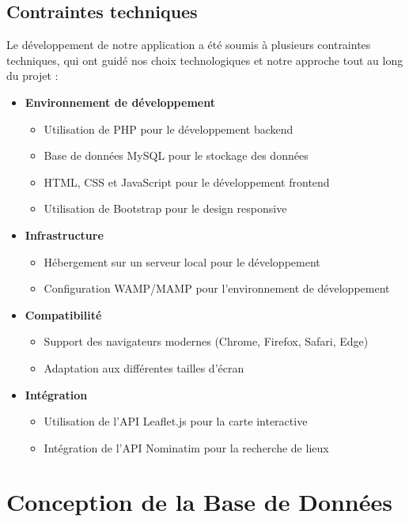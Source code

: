 \documentclass[a4paper,12pt]{article}
\begin{document}
\subsection{Contraintes techniques}

Le développement de notre application a été soumis à plusieurs contraintes techniques, qui ont guidé nos choix technologiques et notre approche tout au long du projet :

\begin{itemize}
  \item \textbf{Environnement de développement}
  \begin{itemize}
    \item Utilisation de PHP pour le développement backend
    \item Base de données MySQL pour le stockage des données
    \item HTML, CSS et JavaScript pour le développement frontend
    \item Utilisation de Bootstrap pour le design responsive
  \end{itemize}

  \item \textbf{Infrastructure}
  \begin{itemize}
    \item Hébergement sur un serveur local pour le développement
    \item Configuration WAMP/MAMP pour l'environnement de développement
  \end{itemize}

  \item \textbf{Compatibilité}
  \begin{itemize}
    \item Support des navigateurs modernes (Chrome, Firefox, Safari, Edge)
    \item Adaptation aux différentes tailles d'écran
  \end{itemize}

  \item \textbf{Intégration}
  \begin{itemize}
    \item Utilisation de l'API Leaflet.js pour la carte interactive
    \item Intégration de l'API Nominatim pour la recherche de lieux
  \end{itemize}
\end{itemize}

\section{Conception de la Base de Données}
\end{document}
